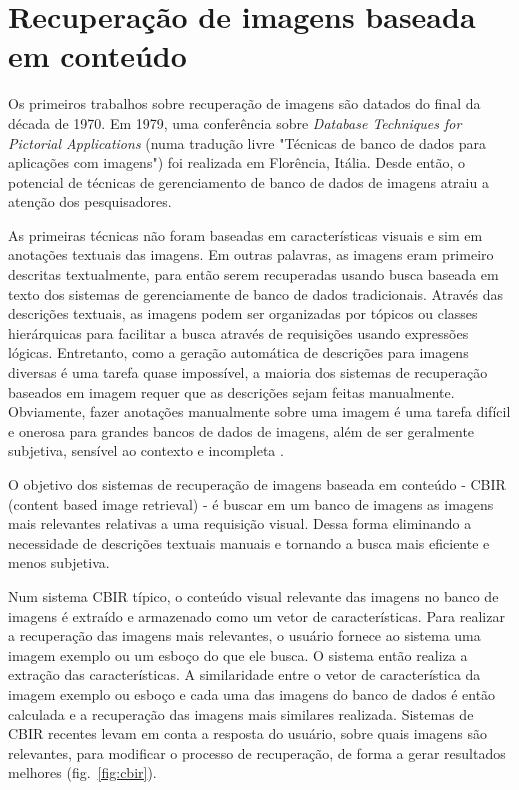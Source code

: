 \chapter{Recuperação de imagens baseada em conteúdo}

Os primeiros trabalhos sobre recuperação de imagens são datados do final da década de 1970. Em 1979, uma conferência sobre \textit{Database Techniques for Pictorial Applications} (numa tradução livre "Técnicas de banco de dados para aplicações com imagens") foi realizada em Florência, Itália. Desde então, o potencial de técnicas de gerenciamento de banco de dados de imagens atraiu a atenção dos pesquisadores.

As primeiras técnicas não foram baseadas em características visuais e sim em anotações textuais das imagens. Em outras palavras, as imagens eram primeiro descritas textualmente, para então serem recuperadas usando busca baseada em texto dos sistemas de gerenciamente de banco de dados tradicionais. Através das descrições textuais, as imagens podem ser organizadas por tópicos ou classes hierárquicas para facilitar a busca através de requisições usando expressões lógicas. Entretanto, como a geração automática de descrições para imagens diversas é uma tarefa quase impossível, a maioria dos sistemas de recuperação baseados em imagem requer que as descrições sejam feitas manualmente. Obviamente, fazer anotações manualmente sobre uma imagem é uma tarefa difícil e onerosa para grandes bancos de dados de imagens, além de ser geralmente subjetiva, sensível ao contexto e incompleta \cite{feng-chapter}.

O objetivo dos sistemas de recuperação de imagens baseada em conteúdo - CBIR (content based image retrieval) - é buscar em um banco de imagens as imagens mais relevantes relativas a uma requisição visual. Dessa forma eliminando a necessidade de descrições textuais manuais e tornando a busca mais eficiente e menos subjetiva.

Num sistema CBIR típico, o conteúdo visual relevante das imagens no banco de imagens é extraído e armazenado como um vetor de características. Para realizar a recuperação das imagens mais relevantes, o usuário fornece ao sistema uma imagem exemplo ou um esboço do que ele busca. O sistema então realiza a extração das características. A similaridade entre o vetor de característica da imagem exemplo ou esboço e cada uma das imagens do banco de dados é então calculada e a recuperação das imagens mais similares realizada. Sistemas de CBIR recentes levam em conta a resposta do usuário, sobre quais imagens são relevantes, para modificar o processo de recuperação, de forma a gerar resultados melhores (fig.~\ref{fig:cbir}).

